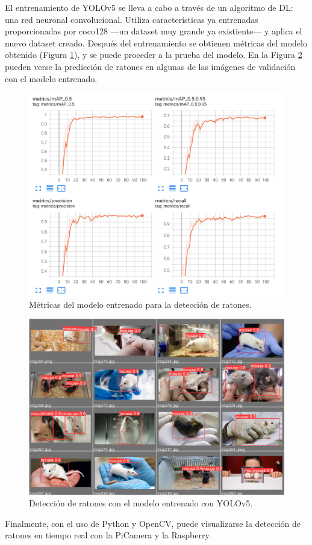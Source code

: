 El entrenamiento de YOLOv5 se lleva a cabo a través de un algoritmo de DL: una red neuronal convolucional. Utiliza características ya entrenadas proporcionadas por coco128 ---un dataset muy grande ya existiente--- y aplica el nuevo dataset creado. Después del entrenamiento se obtienen métricas del modelo obtenido (Figura \ref{fig:metricas}), y se puede proceder a la prueba del modelo. En la Figura \ref{fig:precision} pueden verse la predicción de ratones en algunas de las imágenes de validación con el modelo entrenado.\\
\begin{figure}[h!]
  \begin{center}
    \includegraphics[width=12cm]{figs/metricas}
  \end{center}
\caption{Métricas del modelo entrenado para la detección de ratones.} \label{fig:metricas}
\end{figure}
\begin{figure}[h!]
  \begin{center}
    \includegraphics[width=12cm]{figs/precision}
  \end{center}
\caption{Detección de ratones con el modelo entrenado con YOLOv5.} \label{fig:precision}
\end{figure}
Finalmente, con el uso de Python y OpenCV, puede visualizarse la detección de ratones en tiempo real con la PiCamera y la Raspberry. 

